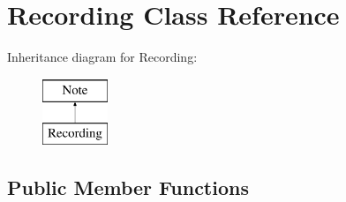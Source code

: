 \hypertarget{class_recording}{}\section{Recording Class Reference}
\label{class_recording}
Inheritance diagram for Recording\+:\begin{figure}[H]
\begin{center}
\leavevmode
\includegraphics[height=2.000000cm]{class_recording}
\end{center}
\end{figure}
\subsection*{Public Member Functions}
